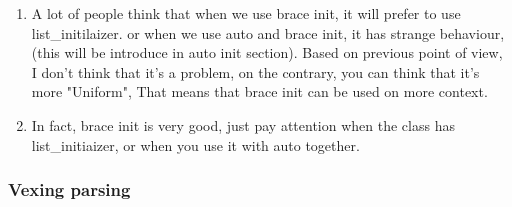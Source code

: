 \documentclass[a4paper,11pt,twoside]{book}
\begin{document}
\begin{itemize}
\begin{enumerate}
		\item A lot of people think that when we use brace init, it will prefer to use list\_initilaizer. or when we use auto and brace init, it has strange behaviour,(this will be introduce in auto init section). Based on previous point of view, I don't think that it's a problem, on the contrary, you can think that it's more "Uniform", That means that brace init can be used on more context. 
		
		\item In fact, brace init is very good, just pay attention when the class has list\_initiaizer, or when you use it with auto together.
	\end{enumerate}
\end{itemize}


\subsubsection{Vexing parsing}
\end{document}
